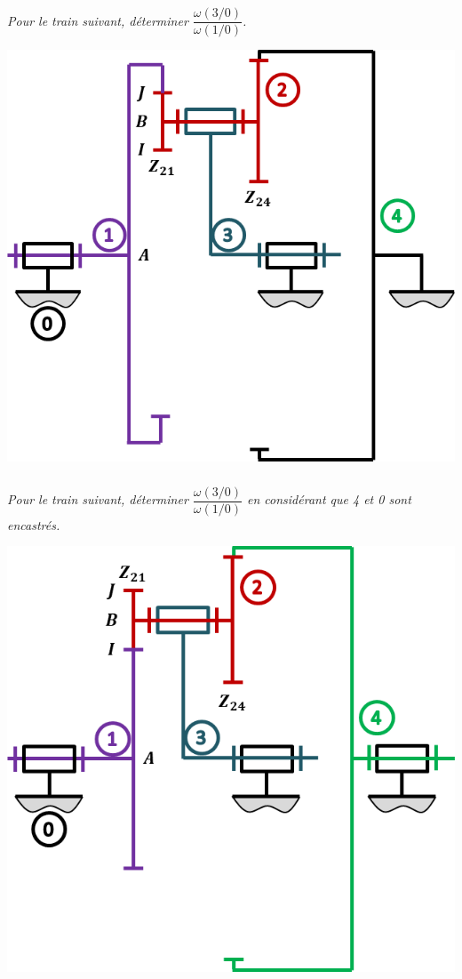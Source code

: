 \documentclass[10pt,fleqn]{article} %
\begin{document}
\begin{multicols}{2}
\subparagraph{}\textit{Pour le train suivant, déterminer $\dfrac{\omega(3/0)}{\omega(1/0)}$.}
\begin{center}
\includegraphics[width=\linewidth]{images/train_03_c}
\end{center}



\subparagraph{}\textit{Pour le train suivant, déterminer $\dfrac{\omega(3/0)}{\omega(1/0)}$ en considérant que 4 et 0 sont encastrés.}

\begin{center}
\includegraphics[width=\linewidth]{images/train_02}
\end{center}



\end{multicols}
\end{document}
